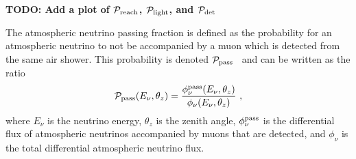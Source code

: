 \textbf{TODO: Add a plot of ${\cal P}_{\rm reach}$, ${\cal P}_{\rm light}$, and ${\cal P}_{\rm det}$}

The atmospheric neutrino passing fraction is defined as the probability for an atmospheric neutrino to not be accompanied by a muon which is detected from the same air shower. This probability is denoted ${\cal P}_{\rm pass}$~\cite{Schonert:2008is, Gaisser:2014bja} and can be written as the ratio
\begin{equation}
{\cal P}_{\rm pass} (E_\nu, \theta_z) = \frac{\phi_\nu^{\rm pass}(E_\nu, \theta_z)}{\phi_\nu(E_\nu, \theta_z)} ~,
\end{equation}
where $E_\nu$ is the neutrino energy, $\theta_z$ is the zenith angle, $\phi_\nu^{\rm pass}$ is the differential flux of atmospheric neutrinos accompanied by muons that are detected, and $\phi_\nu$ is the total differential atmospheric neutrino flux.

